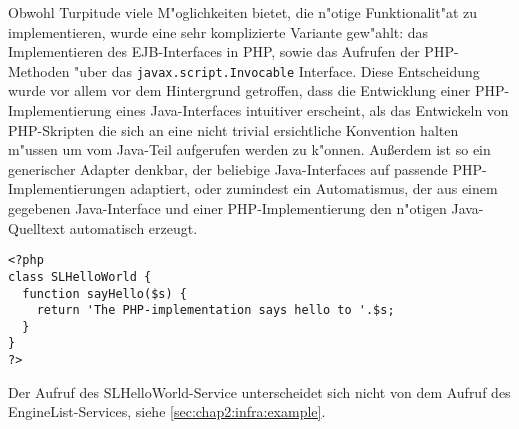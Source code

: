 Obwohl Turpitude viele M"oglichkeiten bietet, die n"otige Funktionalit"at zu implementieren,
wurde eine sehr komplizierte Variante gew"ahlt: das Implementieren des EJB-Interfaces in
PHP, sowie das Aufrufen der PHP-Methoden "uber das \texttt{javax.script.Invocable} Interface. Diese Entscheidung 
wurde vor allem vor dem Hintergrund getroffen, dass die Entwicklung einer PHP-Implementierung eines Java-Interfaces
intuitiver erscheint, als das Entwickeln von PHP-Skripten die sich an eine nicht trivial ersichtliche
Konvention halten m"ussen um vom Java-Teil aufgerufen werden zu k"onnen. Au\ss erdem ist so ein 
generischer Adapter denkbar, der beliebige Java-Interfaces auf passende PHP-Implementierungen adaptiert,
oder zumindest ein Automatismus, der aus einem gegebenen Java-Interface und einer PHP-Implementierung den 
n"otigen Java-Quelltext automatisch erzeugt.

\begin{lstlisting}[caption=PHP-Implementierung]
<?php
class SLHelloWorld {
  function sayHello($s) {
    return 'The PHP-implementation says hello to '.$s;
  }
}
?>
\end{lstlisting}

Der Aufruf des SLHelloWorld-Service unterscheidet sich nicht von dem Aufruf des EngineList-Services, siehe \ref{sec:chap2:infra:example}.


